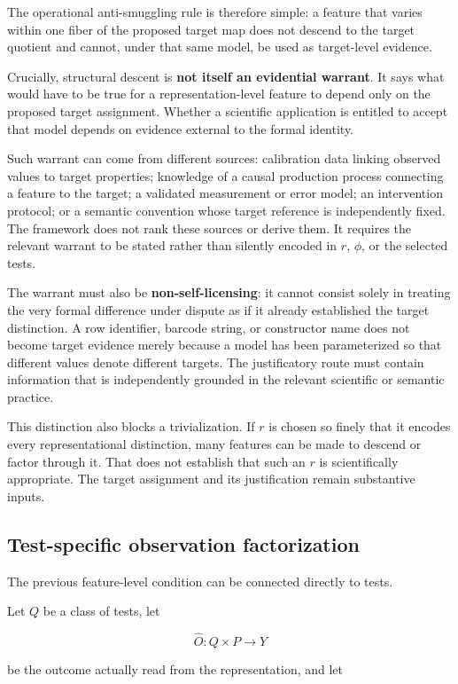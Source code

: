 \documentclass[11pt]{article}
\begin{document}
The operational anti-smuggling rule is therefore simple: a feature that varies within one fiber of the proposed target map does not descend to the target quotient and cannot, under that same model, be used as target-level evidence.

Crucially, structural descent is \textbf{not itself an evidential warrant}. It says what would have to be true for a representation-level feature to depend only on the proposed target assignment. Whether a scientific application is entitled to accept that model depends on evidence external to the formal identity.

Such warrant can come from different sources: calibration data linking observed values to target properties; knowledge of a causal production process connecting a feature to the target; a validated measurement or error model; an intervention protocol; or a semantic convention whose target reference is independently fixed. The framework does not rank these sources or derive them. It requires the relevant warrant to be stated rather than silently encoded in \(r\), \(\phi\), or the selected tests.

The warrant must also be \textbf{non-self-licensing}: it cannot consist solely in treating the very formal difference under dispute as if it already established the target distinction. A row identifier, barcode string, or constructor name does not become target evidence merely because a model has been parameterized so that different values denote different targets. The justificatory route must contain information that is independently grounded in the relevant scientific or semantic practice.

This distinction also blocks a trivialization. If \(r\) is chosen so finely that it encodes every representational distinction, many features can be made to descend or factor through it. That does not establish that such an \(r\) is scientifically appropriate. The target assignment and its justification remain substantive inputs.

\subsection{Test-specific observation factorization}

The previous feature-level condition can be connected directly to tests.

Let \(Q\) be a class of tests, let

\[
\widehat O:Q\times P\to Y
\]

be the outcome actually read from the representation, and let
\end{document}
